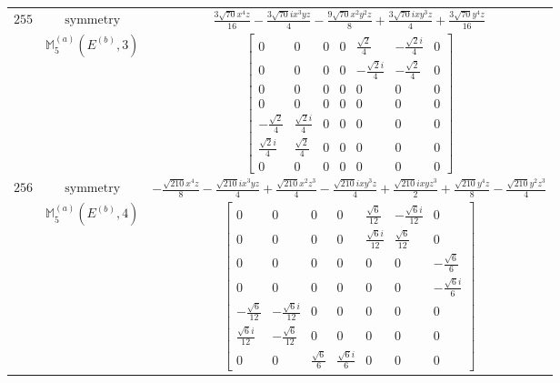\documentclass[fleqn,8pt,landscape]{jsarticle}
\begin{document}
\begin{longtable}{ccc}
$ 255 $ & $ \text{symmetry} $ & $ \frac{3 \sqrt{70} x^{4} z}{16} - \frac{3 \sqrt{70} i x^{3} y z}{4} - \frac{9 \sqrt{70} x^{2} y^{2} z}{8} + \frac{3 \sqrt{70} i x y^{3} z}{4} + \frac{3 \sqrt{70} y^{4} z}{16} $ \\
$  $ & $ \mathbb{M}_{5}^{(a)}(E^{(b)},3) $ & $ \begin{bmatrix} 0 & 0 & 0 & 0 & \frac{\sqrt{2}}{4} & - \frac{\sqrt{2} i}{4} & 0 \\ 0 & 0 & 0 & 0 & - \frac{\sqrt{2} i}{4} & - \frac{\sqrt{2}}{4} & 0 \\ 0 & 0 & 0 & 0 & 0 & 0 & 0 \\ 0 & 0 & 0 & 0 & 0 & 0 & 0 \\ - \frac{\sqrt{2}}{4} & \frac{\sqrt{2} i}{4} & 0 & 0 & 0 & 0 & 0 \\ \frac{\sqrt{2} i}{4} & \frac{\sqrt{2}}{4} & 0 & 0 & 0 & 0 & 0 \\ 0 & 0 & 0 & 0 & 0 & 0 & 0 \end{bmatrix} $ \\ \hline
$ 256 $ & $ \text{symmetry} $ & $ - \frac{\sqrt{210} x^{4} z}{8} - \frac{\sqrt{210} i x^{3} y z}{4} + \frac{\sqrt{210} x^{2} z^{3}}{4} - \frac{\sqrt{210} i x y^{3} z}{4} + \frac{\sqrt{210} i x y z^{3}}{2} + \frac{\sqrt{210} y^{4} z}{8} - \frac{\sqrt{210} y^{2} z^{3}}{4} $ \\
$  $ & $ \mathbb{M}_{5}^{(a)}(E^{(b)},4) $ & $ \begin{bmatrix} 0 & 0 & 0 & 0 & \frac{\sqrt{6}}{12} & - \frac{\sqrt{6} i}{12} & 0 \\ 0 & 0 & 0 & 0 & \frac{\sqrt{6} i}{12} & \frac{\sqrt{6}}{12} & 0 \\ 0 & 0 & 0 & 0 & 0 & 0 & - \frac{\sqrt{6}}{6} \\ 0 & 0 & 0 & 0 & 0 & 0 & - \frac{\sqrt{6} i}{6} \\ - \frac{\sqrt{6}}{12} & - \frac{\sqrt{6} i}{12} & 0 & 0 & 0 & 0 & 0 \\ \frac{\sqrt{6} i}{12} & - \frac{\sqrt{6}}{12} & 0 & 0 & 0 & 0 & 0 \\ 0 & 0 & \frac{\sqrt{6}}{6} & \frac{\sqrt{6} i}{6} & 0 & 0 & 0 \end{bmatrix} $ \\ \hline
\end{longtable}
\end{document}
